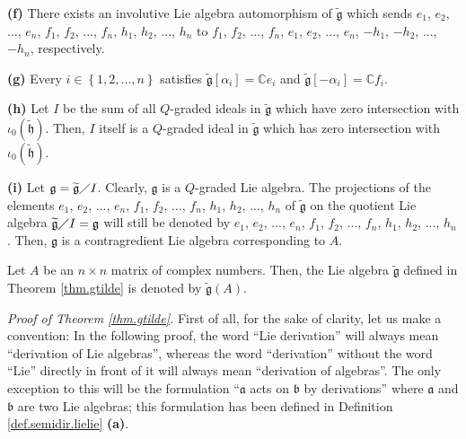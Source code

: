 \documentclass[etingof-lie.tex]{subfiles}
\begin{document}
\begin{theorem}
\textbf{(f)} There exists an involutive Lie algebra automorphism of
$\widetilde{\mathfrak{g}}$ which sends $e_{1}$, $e_{2}$, $...$, $e_{n}$,
$f_{1}$, $f_{2}$, $...$, $f_{n}$, $h_{1}$, $h_{2}$, $...$, $h_{n}$ to $f_{1}$,
$f_{2}$, $...$, $f_{n}$, $e_{1}$, $e_{2}$, $...$, $e_{n}$, $-h_{1}$, $-h_{2}$,
$...$, $-h_{n}$, respectively.

\textbf{(g)} Every $i\in\left\{  1,2,...,n\right\}  $ satisfies
$\widetilde{\mathfrak{g}}\left[  \alpha_{i}\right]  =\mathbb{C}e_{i}$ and
$\widetilde{\mathfrak{g}}\left[  -\alpha_{i}\right]  =\mathbb{C}f_{i}$.

\textbf{(h)} Let $I$ be the sum of all $Q$-graded ideals in
$\widetilde{\mathfrak{g}}$ which have zero intersection with $\iota_{0}\left(
\widetilde{\mathfrak{h}}\right)  $. Then, $I$ itself is a $Q$-graded ideal in
$\widetilde{\mathfrak{g}}$ which has zero intersection with $\iota_{0}\left(
\widetilde{\mathfrak{h}}\right)  $.

\textbf{(i)} Let $\mathfrak{g}=\widetilde{\mathfrak{g}}\diagup I$. Clearly,
$\mathfrak{g}$ is a $Q$-graded Lie algebra. The projections of the elements
$e_{1}$, $e_{2}$, $...$, $e_{n}$, $f_{1}$, $f_{2}$, $...$, $f_{n}$, $h_{1}$,
$h_{2}$, $...$, $h_{n}$ of $\widetilde{\mathfrak{g}}$ on the quotient Lie
algebra $\widetilde{\mathfrak{g}}\diagup I=\mathfrak{g}$ will still be denoted
by $e_{1}$, $e_{2}$, $...$, $e_{n}$, $f_{1}$, $f_{2}$, $...$, $f_{n}$, $h_{1}%
$, $h_{2}$, $...$, $h_{n}$. Then, $\mathfrak{g}$ is a contragredient Lie
algebra corresponding to $A$.
\end{theorem}

\begin{definition}
Let $A$ be an $n\times n$ matrix of complex numbers. Then, the Lie algebra
$\widetilde{\mathfrak{g}}$ defined in Theorem \ref{thm.gtilde} is denoted by
$\widetilde{\mathfrak{g}}\left(  A\right)  $.
\end{definition}

\textit{Proof of Theorem \ref{thm.gtilde}.} First of all, for the sake of
clarity, let us make a convention: In the following proof, the word ``Lie
derivation'' will always mean ``derivation of Lie algebras'', whereas the word
``derivation'' without the word ``Lie'' directly in front of it will always
mean ``derivation of algebras''. The only exception to this will be the
formulation ``$\mathfrak{a}$ acts on $\mathfrak{b}$ by derivations'' where
$\mathfrak{a}$ and $\mathfrak{b}$ are two Lie algebras; this formulation has
been defined in Definition \ref{def.semidir.lielie} \textbf{(a)}.
\end{document}
